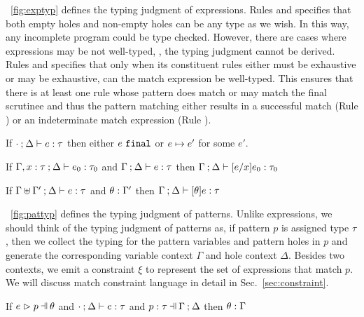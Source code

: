 \documentclass[runningheads,envcountsame,a4paper]{llncs}
\begin{document}


\figurename~\ref{fig:exptyp} defines the typing judgment of expressions. Rules
\TEHole and \THole specifies that both empty holes and non-empty holes can be
any type as we wish. In this way, any incomplete program could be type checked.
However, there are cases where expressions may be not well-typed, \ie, the
typing judgment cannot be derived. Rules \TMatchZPre and \TMatchNZPre specifies
that only when its constituent rules either must be exhaustive or may be
exhaustive, can the match expression be well-typed. This ensures that there is
at least one rule whose pattern does match or may match the final scrutinee and
thus the pattern matching either results in a successful match (Rule
\ITSuccMatch) or an indeterminate match expression (Rule \IMatch).

\begin{theorem}[Progress]
  \label{thrm:progress}
  If $\cdot \mathbin{;} \Delta \vdash e : \tau$ then either $e ~\mathtt{final}$ or $e \mapsto e'$ for some $e'$.
\end{theorem}



\begin{lemma}[Substitution]
  \label{lem:substitution}
  If $\Gamma, x : \tau \mathbin{;} \Delta \vdash e_0 : \tau_0$ and $\Gamma \mathbin{;} \Delta \vdash e : \tau$
  then $\Gamma \mathbin{;} \Delta \vdash [e/x]e_0 : \tau_0$
\end{lemma}

\begin{lemma}
  \label{lem:simult-substitution}
  If $\Gamma \uplus \Gamma' \mathbin{;} \Delta \vdash e : \tau$ and $\theta : \Gamma'$
  then $\Gamma \mathbin{;} \Delta \vdash [\theta]e : \tau$
\end{lemma}



\figurename~\ref{fig:pattyp} defines the typing judgment of patterns. Unlike
expressions, we should think of the typing judgment of patterns as, if pattern
$p$ is assigned type $\tau$, then we collect the typing for the pattern
variables and pattern holes in $p$ and generate the corresponding variable
context $\Gamma$ and hole context $\Delta$. Besides two contexts, we emit a
constraint $\xi$ to represent the set of expressions that match $p$. We will
discuss match constraint language in detail in Sec.~\ref{sec:constraint}.

\begin{lemma}
  \label{lem:subs-typing}
  If $\hpatmatch{e}{p}{\theta}$ and $\cdot \mathbin{;} \Delta \vdash e : \tau$ and $\hpattyp{p}{\tau}{\Gamma}{\Delta}$
  then $\theta : \Gamma$
\end{lemma}
\end{document}
